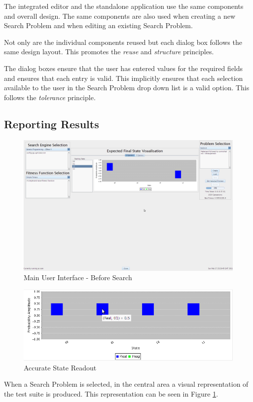 The integrated editor and the standalone application use the same components and overall design.
The same components are also used when creating a new Search Problem and when editing an existing Search Problem.

Not only are the individual components reused but each dialog box follows the same design layout.
This promotes the \emph{reuse} and \emph{structure} principles.

The dialog boxes ensure that the user has entered values for the required fields and ensures that each entry is valid.
This implicitly ensures that each selection available to the user in the Search Problem drop down list is a valid option.
This follows the \emph{tolerance} principle.

\subsection{Reporting Results}
\label{sec:repres}

\begin{figure}
 \includegraphics[width=\textwidth]{GUIDesignProgress.png}
\caption{Main User Interface - Before Search}
\label{fig:MainGUIDesignProg}
\end{figure}
\begin{figure}
 \includegraphics[width=\textwidth]{AccurateReadOutMouseOver.png}
\caption{Accurate State Readout}
\label{fig:AccStateReadOut}
\end{figure}
When a Search Problem is selected, in the central area a visual representation of the test suite is produced.
This representation can be seen in Figure \ref{fig:MainGUIDesignProg}.

